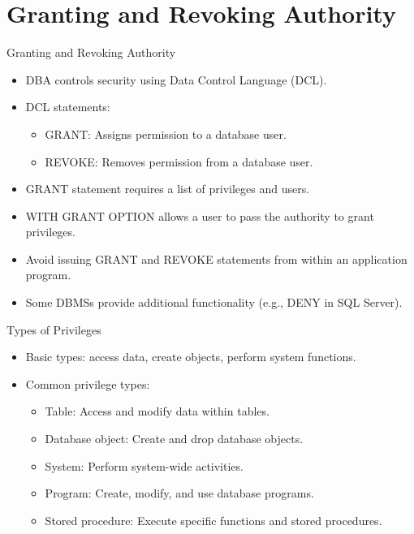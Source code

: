 \documentclass[aspectratio=169]{beamer}
\begin{document}
\section{Granting and Revoking Authority}

\begin{frame}{Granting and Revoking Authority}
  \begin{itemize}
    \item DBA controls security using Data Control Language (DCL).
    \item DCL statements:
      \begin{itemize}
        \item GRANT: Assigns permission to a database user.
        \item REVOKE: Removes permission from a database user.
      \end{itemize}
    \item GRANT statement requires a list of privileges and users.
    \item WITH GRANT OPTION allows a user to pass the authority to grant privileges.
    \item Avoid issuing GRANT and REVOKE statements from within an application program.
    \item Some DBMSs provide additional functionality (e.g., DENY in SQL Server).
  \end{itemize}
\end{frame}

\begin{frame}{Types of Privileges}
  \begin{itemize}
    \item Basic types: access data, create objects, perform system functions.
    \item Common privilege types:
      \begin{itemize}
        \item Table: Access and modify data within tables.
        \item Database object: Create and drop database objects.
        \item System: Perform system-wide activities.
        \item Program: Create, modify, and use database programs.
        \item Stored procedure: Execute specific functions and stored procedures.
      \end{itemize}
  \end{itemize}
\end{frame}
\end{document}
